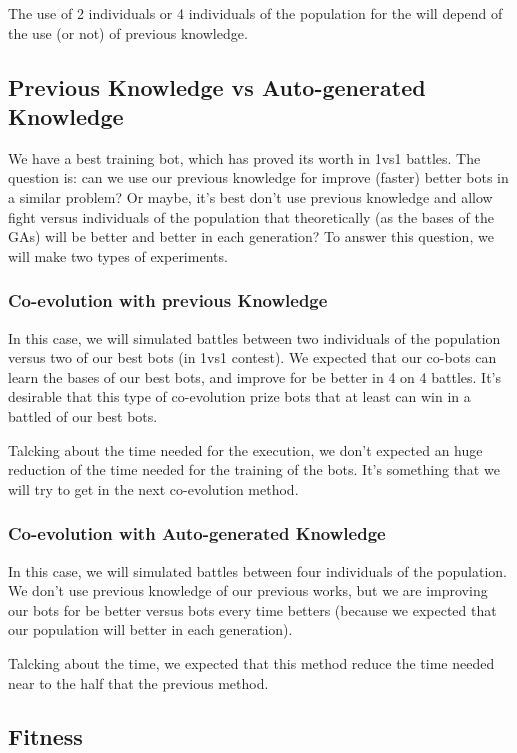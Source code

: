 \documentclass{llncs}
\begin{document}
The use of 2 individuals or 4 individuals of the population for the  will depend of the use (or not) of previous knowledge. 

\subsection{Previous Knowledge vs Auto-generated Knowledge}
\label{sec:knowledge}

We have a best training bot, which has proved its worth in 1vs1 battles. The question is: can we use our previous knowledge for improve (faster) better bots in a similar problem? Or maybe, it's best don't use previous knowledge and allow fight versus individuals of the population that theoretically (as the bases of the GAs) will be better and better in each generation? To answer this question, we will make two types of experiments.

\subsubsection{Co-evolution with previous Knowledge}
\label{sec:knowledge:previous}

In this case, we will simulated battles between two individuals of the population versus two of our best bots (in 1vs1 contest). We expected that our co-bots can learn the bases of our best bots, and improve for be better in 4 on 4 battles. It's desirable that this type of co-evolution prize bots that at least can win in a battled of our best bots.

Talcking about the time needed for the execution, we don't expected an huge reduction of the time needed for the training of the bots. It's something that we will try to get in the next co-evolution method.

\subsubsection{Co-evolution with Auto-generated Knowledge}
In this case, we will simulated battles between four individuals of the population. We don't use previous knowledge of our previous works, but we are improving our bots for be better versus bots every time betters (because we expected that our population will better in each generation).

Talcking about the time, we expected that this method reduce the time needed near to the half that the previous method.

\subsection{Fitness}
\end{document}
